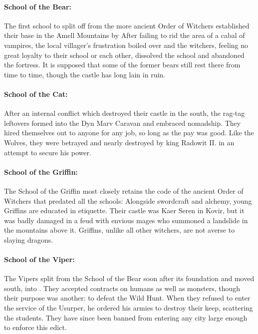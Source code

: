 \documentclass[parskip=full,11pt,%
footheight=38pt]{scrreport}
\begin{document}
\paragraph{School of the Bear:}
The first school to split off from the more ancient Order of Witchers established their base in the Amell Mountains by 
After failing to rid the area of a cabal of vampires, the local villager's frustration boiled over and the witchers,
feeling no great loyalty to their school or each other, dissolved the school and abandoned the fortress. It is supposed
that some of the former bears still rest there from time to time, though the castle has long lain in ruin.

\paragraph{School of the Cat:}
After an internal conflict which destroyed their castle in the south, the rag-tag leftovers formed into the Dyn Marv Caravan and embraced nomadship.
They hired themselves out to anyone for any job, so long as the pay was good. Like the Wolves, they were betrayed and nearly
destroyed by king Radowit II. in an attempt to secure his power.

\paragraph{School of the Griffin:}
The School of the Griffin most closely retains the code of the ancient Order of Witchers that predated all the schools:
Alongside swordcraft and alchemy, young Griffins are educated in etiquette. Their castle was Kaer Seren in Kovir, but it was
badly damaged in a feud with envious mages who summoned a landslide in the mountains above it. Griffins, unlike all other
witchers, are not averse to slaying dragons.

\paragraph{School of the Viper:}
The Vipers split from the School of the Bear soon after its foundation and moved south, into .
They accepted contracts on humans as well as monsters, though their purpose was another: to defeat the Wild Hunt.
When they refused to enter the service of the Usurper, he ordered his armies to destroy their keep, scattering the students.
They have since been banned from entering any city large enough to enforce this edict.
\end{document}
